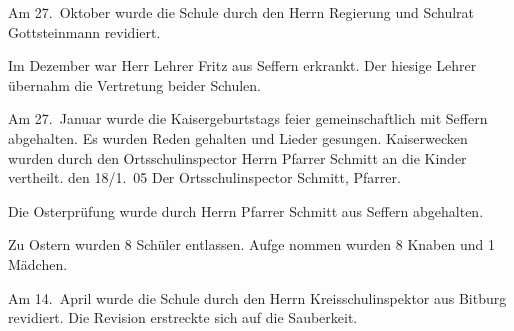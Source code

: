 

\pstart
Am 27.\ Oktober wurde die Schule durch den\ob
Herrn Regierung und Schulrat Gottsteinmann\unsicher\ob
revidiert.

\pend
{}
\pstart

Im Dezember war Herr Lehrer Fritz aus\ob
Seffern erkrankt. Der hiesige Lehrer übernahm\ob
die Vertretung beider Schulen.

\pend
{}
\pstart

Am 27.\ Januar wurde die Kaisergeburtstags\ohb
feier gemeinschaftlich mit Seffern abgehalten.\ob
Es wurden Reden gehalten und Lieder gesungen.\ob
Kaiserwecken wurden durch den Ortsschulinspector\ob
Herrn Pfarrer Schmitt an die Kinder vertheilt.
den 18/1.\ 05
Der Ortsschulinspector
Schmitt, Pfarrer.

\pend
{}
\pstart

Die Osterprüfung wurde durch Herrn Pfarrer\ob
Schmitt aus Seffern abgehalten.

\pend
{}
\pstart

Zu Ostern wurden 8 Schüler entlassen. Aufge\ohb
nommen wurden 8 Knaben und 1 Mädchen.

\pend
{}
\pstart

Am 14.\ April wurde die Schule durch den\ob
Herrn Kreisschulinspektor aus Bitburg revidiert.\ob
Die Revision erstreckte sich auf die Sauberkeit.
\pend
